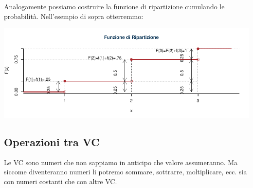 \documentclass[
  11pt,
]{book}
\theoremstyle{mytheoremstyle}
\theoremstyle{mydefstyle}
\begin{document}
Analogamente possiamo costruire la funzione di ripartizione cumulando le probabilità.
Nell'esempio di sopra otterremmo:

\begin{center}\includegraphics{Appunti_di_Statistica_2025_files/figure-latex/06-Variabili-Casuali-2,-1} \end{center}

\subsection{Operazioni tra VC}\label{operazioni-tra-vc}

Le VC sono numeri che non sappiamo in anticipo che valore assumeranno. Ma siccome
diventeranno numeri li potremo sommare, sottrarre, moltiplicare, ecc. sia con numeri
costanti che con altre VC.
\end{document}
